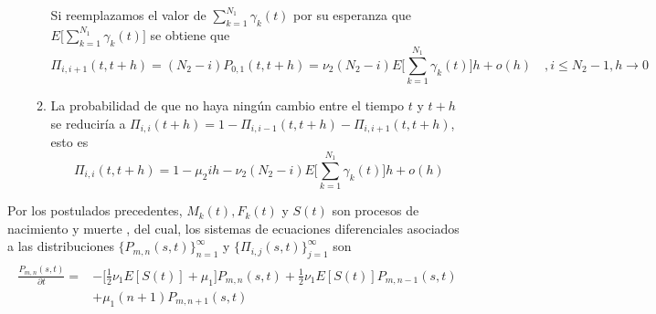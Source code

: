 \begin{itemize}
\begin{enumerate}
        Si reemplazamos el valor de $\sum_{k=1}^{N_1}\gamma_k(t)$ por su esperanza que $E\big[\sum_{k=1}^{N_1}\gamma_k(t)\big]$ se obtiene que
        $$\Pi_{i,i+1}(t,t+h)=(N_2-i)P_{0,1}(t,t+h)= \nu_2(N_2-i)E\bigg[\sum_{k=1}^{N_1}\gamma_k(t)\bigg]h+o(h)\quad ,i\leq N_2-1, h\rightarrow 0$$
        \item La probabilidad de que no haya ningún cambio entre el tiempo $t$ y $t+h$ se reduciría a  $\Pi_{i,i}(t+h)=1-\Pi_{i,i-1}(t,t+h)-\Pi_{i,i+1}(t,t+h)$, esto es $$\Pi_{i,i}(t,t+h)=1-\mu_2 i h-\nu_2(N_2-i)E\bigg[\sum_{k=1}^{N_1}\gamma_k(t)\bigg]h+o(h)$$
    \end{enumerate}
\end{itemize}
\begin{comment}
    \begin{Prop}
    \begin{eqnarray}
        E[S(t)]=\sum_{j=1}^{N_2}j\sum_{i=1}^{N_2}\pi_{i}\Pi_{i,j}(0,t).
        \label{equation-E(S)-probInicial}
    \end{eqnarray}
\end{Prop}
\begin{Prop}
    \begin{eqnarray}
    \label{equation-E(gamma)-probInicial}
        \begin{array}{cr}
            E\bigg[\sum_{k=1}^{N_1}\gamma_k(t)\bigg]=& \sum_{k=1}^{N_1}\sum_{r=1}^\infty\bigg[\sum_{\rho=0}^\infty p_\rho^{(k)}P_{\rho,r}(0,t)\sum_{n=r}^\infty\sum_{m=0}q_m^{(k)}P_{m,n}(0,t) \\
             &+\sum_{n=r+1}^\infty\sum_{\rho=0}^\infty p_j^{(k)}P_{\rho, n}(0,t)\sum_{m=0}^\infty q_m^{(k)}P_{m,r}(0,t)\bigg]
        \end{array}
    \end{eqnarray}
\end{Prop}
Usando las relaciones \ref{equation-E(S)-probInicial} y \ref{equation-E(gamma)-probInicial} los precedentes postulados pueden ser expresados usando solo las distribuciones iniciales y las transiciones $\Pi_{i,j}(0,t)$ y $P_{m,n}(0,t)$.\\
\end{comment}
Por los postulados precedentes, $M_k(t), F_k(t)$ y $S(t)$ son procesos de nacimiento y muerte , del cual, los sistemas de ecuaciones diferenciales asociados a las distribuciones $\{P_{m,n}(s,t)\}_{n=1}^\infty$ y $\{\Pi_{i,j}(s,t)\}_{j=1}^\infty$ son
\begin{eqnarray}
    \begin{array}{cr}
        \frac{P_{m,n}(s,t)}{\partial t} = & -\bigg[\frac{1}{2}\nu_1E[S(t)]+\mu_1\bigg]P_{m,n}(s,t)+\frac{1}{2}\nu_1E[S(t)]P_{m,n-1}(s,t) \\
        & +\mu_1 (n+1)P_{m,n+1}(s,t)
    \end{array}
    \label{tesis-edo-p_n}
\end{eqnarray}
